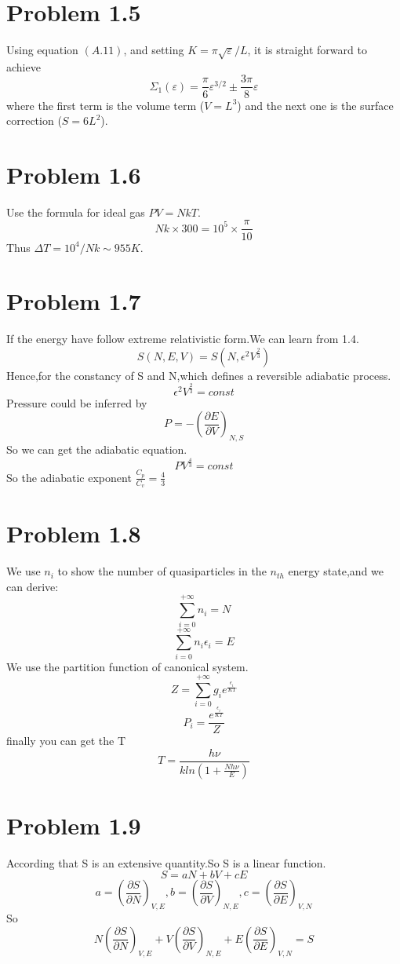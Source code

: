 \documentclass{article}
\begin{document}
\section*{Problem 1.5}
Using equation $(A.11)$, and setting $K = \pi \sqrt{\varepsilon}/L$, it is straight forward to achieve
\begin{equation}
\Sigma_{1}(\varepsilon) = \frac{\pi}{6}\varepsilon^{3/2} \pm \frac{3 \pi}{8} \varepsilon
\end{equation}
where the first term is the volume term ($V=L^{3}$) and the next one is the surface correction ($S=6L^{2}$).



\section*{Problem 1.6}
Use the formula for ideal gas $PV=NkT$.
\begin{equation}
N k \times 300= 10^{5} \times \frac{\pi}{10}
\end{equation}
Thus $\Delta T = 10^{4}/Nk \sim 955 K$.

\section*{Problem 1.7}
If the energy have follow extreme relativistic form.We can learn from 1.4.
$$S(N,E,V)=S(N,\epsilon^2V^\frac{2}{3})$$
Hence,for the constancy of S and N,which defines a reversible adiabatic process.
$$\epsilon^2V^\frac{2}{3}=const$$
Pressure could be inferred by
$$P=-(\frac{\partial E}{\partial V})_{N,S}$$
So we can get the adiabatic equation.
$$PV^\frac{4}{3}=const$$
So the adiabatic exponent $\frac{C_p}{C_v}=\frac{4}{3}$
\section*{Problem 1.8}
We use $n_i$ to show the number of quasiparticles in the $n_{th}$ energy state,and we can derive:
$$\sum_{i=0}^{+\infty}n_i=N$$
$$\sum_{i=0}^{+\infty}n_i\epsilon_i=E$$
We use the partition function of canonical system.
$$Z=\sum_{i=0}^{+\infty}g_ie^{\frac{\epsilon_i}{KT}}$$
$$P_i=\frac{e^{\frac{\epsilon_i}{KT}}}{Z}$$
finally you can get the T
$$T=\frac{h\nu}{kln(1+\frac{Nh\nu}{E})}$$
\section*{Problem 1.9}
According that S is an extensive quantity.So S is a linear function.
$$S=aN+bV+cE$$
$$a=(\frac{\partial S}{\partial N})_{V,E},b=(\frac{\partial S}{\partial V})_{N,E},c=(\frac{\partial S}{\partial E})_{V,N}$$
So
$$N(\frac{\partial S}{\partial N})_{V,E}+V(\frac{\partial S}{\partial V})_{N,E}+E(\frac{\partial S}{\partial E})_{V,N}=S$$
\end{document}
